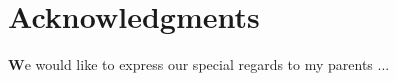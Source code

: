 \section*{Acknowledgments}


\vspace{1cm}
\par \textbf{W}e would like to express our special regards to my parents ...\\
\\
